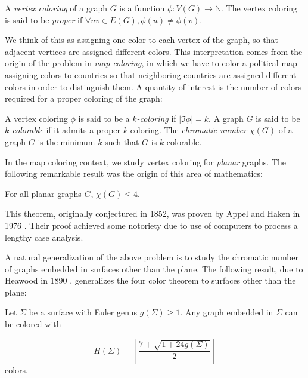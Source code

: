 \begin{definition}
A \emph{vertex coloring} of a graph $G$ is a function $\phi : V(G) \rightarrow \mathbb{N}$. The vertex coloring is said to be \emph{proper} if $\forall uv \in E(G), \phi(u) \neq \phi(v)$. 
\end{definition}

We think of this as assigning one color to each vertex of the graph, so that adjacent vertices are assigned different colors. This interpretation comes from the origin of the problem in \textit{map coloring}, in which we have to color a political map assigning colors to countries so that neighboring countries are assigned different colors in order to distinguish them. A quantity of interest is the number of colors required for a proper coloring of the graph:

\begin{definition}
A vertex coloring $\phi$ is said to be a $k$\emph{-coloring} if $|\Im \phi| = k$. A graph $G$ is said to be $k$\emph{-colorable} if it admits a proper $k$-coloring. The \emph{chromatic number} $\chi(G)$ of a graph $G$ is the minimum $k$ such that $G$ is $k$-colorable. 
\end{definition}

In the map coloring context, we study vertex coloring for \emph{planar} graphs. The following remarkable result was the origin of this area of mathematics:

\begin{theorem}
For all planar graphs $G$, $\chi(G) \leq 4$.
\end{theorem}

This theorem, originally conjectured in 1852, was proven by Appel and Haken in 1976 \cite{4ct1, 4ct2}. Their proof achieved some notoriety due to use of computers to process a lengthy case analysis. 

A natural generalization of the above problem is to study the chromatic number of graphs embedded in surfaces other than the plane. The following result, due to Heawood in 1890 \cite{heawoodmapcolour}, generalizes the four color theorem to surfaces other than the plane:

\begin{theorem}[Heawood]
Let $\Sigma$ be a surface with Euler genus $g(\Sigma) \geq 1$. Any graph embedded in $\Sigma$ can be colored with

$$
H(\Sigma) = \left\lfloor \frac{7 + \sqrt{1+24g(\Sigma)}}{2} \right\rfloor
$$
colors.
\end{theorem}

